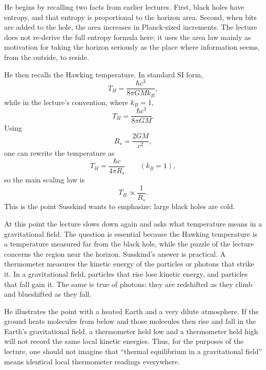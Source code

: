 He begins by recalling two facts from earlier lectures. First, black holes have entropy, and that entropy is proportional to the horizon area. Second, when bits are added to the hole, the area increases in Planck-sized increments. The lecture does not re-derive the full entropy formula here; it uses the area law mainly as motivation for taking the horizon seriously as the place where information seems, from the outside, to reside.

He then recalls the Hawking temperature. In standard SI form,
\begin{equation}
T_H=\frac{\hbar c^3}{8\pi GM k_B},
\end{equation}
while in the lecture's convention, where \(k_B=1\),
\begin{equation}
T_H=\frac{\hbar c^3}{8\pi GM}.
\end{equation}
Using
\begin{equation}
R_s=\frac{2GM}{c^2},
\end{equation}
one can rewrite the temperature as
\begin{equation}
T_H=\frac{\hbar c}{4\pi R_s}
\qquad (k_B=1),
\end{equation}
so the main scaling law is
\begin{equation}
T_H\propto \frac{1}{R_s}.
\end{equation}
This is the point Susskind wants to emphasize: large black holes are cold.

At this point the lecture slows down again and asks what temperature means in a gravitational field. The question is essential because the Hawking temperature is a temperature measured far from the black hole, while the puzzle of the lecture concerns the region near the horizon. Susskind's answer is practical. A thermometer measures the kinetic energy of the particles or photons that strike it. In a gravitational field, particles that rise lose kinetic energy, and particles that fall gain it. The same is true of photons: they are redshifted as they climb and blueshifted as they fall.

He illustrates the point with a heated Earth and a very dilute atmosphere. If the ground heats molecules from below and those molecules then rise and fall in the Earth's gravitational field, a thermometer held low and a thermometer held high will not record the same local kinetic energies. Thus, for the purposes of the lecture, one should not imagine that ``thermal equilibrium in a gravitational field'' means identical local thermometer readings everywhere.

